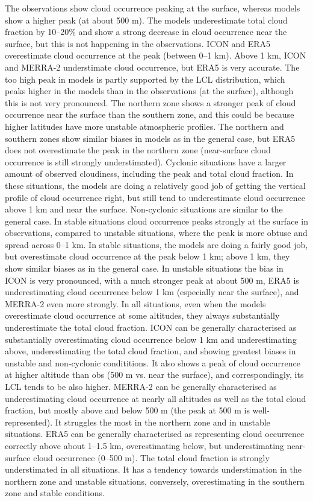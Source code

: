 \documentclass[12pt,a4paper]{article}
\begin{document}
The observations show cloud occurrence peaking at the surface, whereas models
show a higher peak (at about 500 m). The models underestimate total cloud
fraction by 10--20\% and show a strong decrease in cloud occurrence near the
surface, but this is not happening in the observations. ICON and ERA5
overestimate cloud occurrence at the peak (between 0--1 km). Above 1 km, ICON
and MERRA-2 understimate cloud occurrence, but ERA5 is very accurate. The too
high peak in models is partly supported by the LCL distribution, which peaks
higher in the models than in the observations (at the surface), although this
is not very pronounced. The northern zone shows a stronger peak of cloud
occurrence near the surface than the southern zone, and this could be because
higher latitudes have more unstable atmospheric profiles. The northern and
southern zones show similar biases in models as in the general case, but ERA5
does not overestimate the peak in the northern zone (near-surface cloud
occurrence is still strongly understimated). Cyclonic situations have a larger
amount of observed cloudiness, including the peak and total cloud fraction. In
these situations, the models are doing a relatively good job of getting the
vertical profile of cloud occurrence right, but still tend to underestimate
cloud occurrence above 1 km and near the surface. Non-cyclonic situations are
similar to the general case. In stable situations cloud occurrence peaks
strongly at the surface in observations, compared to unstable situations, where
the peak is more obtuse and spread across 0--1 km. In stable situations, the
models are doing a fairly good job, but overestimate cloud occurrence at the
peak below 1 km; above 1 km, they show similar biases as in the general case.
In unstable situations the bias in ICON is very pronounced, with a much
stronger peak at about 500 m, ERA5 is underestimating cloud occurrence below 1
km (especially near the surface), and MERRA-2 even more strongly. In all
situations, even when the models overestimate cloud occurrence at some
altitudes, they always substantially underestimate the total cloud fraction.
ICON can be generally characterised as substantially overestimating cloud
occurrence below 1 km and underestimating above, underestimating the total
cloud fraction, and showing greatest biases in unstable and non-cyclonic
condititions. It also shows a peak of cloud occurrence at higher altitude than
obs (500 m vs. near the surface), and correspondingly, its LCL tends to be also
higher. MERRA-2 can be generally characterised as underestimating cloud
occurrence at nearly all altitudes as well as the total cloud fraction, but
mostly above and below 500 m (the peak at 500 m is well-represented). It
struggles the most in the northern zone and in unstable situations. ERA5 can be
generally characterised as representing cloud occurrence correctly above about
1--1.5 km, overestimating below, but underestimating near-surface cloud
occurrence (0--500 m). The total cloud fraction is strongly understimated in
all situations. It has a tendency towards understimation in the northern zone
and unstable situations, conversely, overestimating in the southern zone and
stable conditions.
\end{document}
